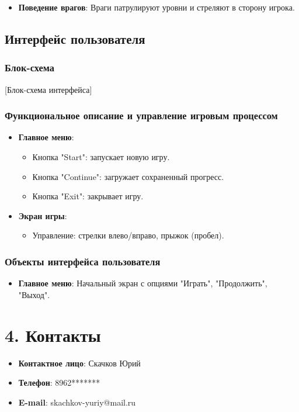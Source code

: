 \documentclass[a4paper,12pt]{article}
\begin{document}
\begin{itemize}
    \item \textbf{Поведение врагов}: Враги патрулируют уровни и стреляют в сторону игрока.
\end{itemize}

\subsection{Интерфейс пользователя}

\subsubsection{Блок-схема}

[Блок-схема интерфейса]

\subsubsection{Функциональное описание и управление игровым процессом}

\begin{itemize}
    \item \textbf{Главное меню}:
    \begin{itemize}
        \item Кнопка "Start": запускает новую игру.
        \item Кнопка "Continue": загружает сохраненный прогресс.
        \item Кнопка "Exit": закрывает игру.
    \end{itemize}
    \item \textbf{Экран игры}:
    \begin{itemize}
        \item Управление: стрелки влево/вправо, прыжок (пробел).
    \end{itemize}
\end{itemize}

\subsubsection{Объекты интерфейса пользователя}

\begin{itemize}
    \item \textbf{Главное меню}: Начальный экран с опциями "Играть", "Продолжить", "Выход".
\end{itemize}

\newpage

\section{4. Контакты}

\begin{itemize}
    \item \textbf{Контактное лицо}: Скачков Юрий
    \item \textbf{Телефон}: 8962*******
    \item \textbf{E-mail}: skachkov-yuriy@mail.ru
\end{itemize}
\end{document}
